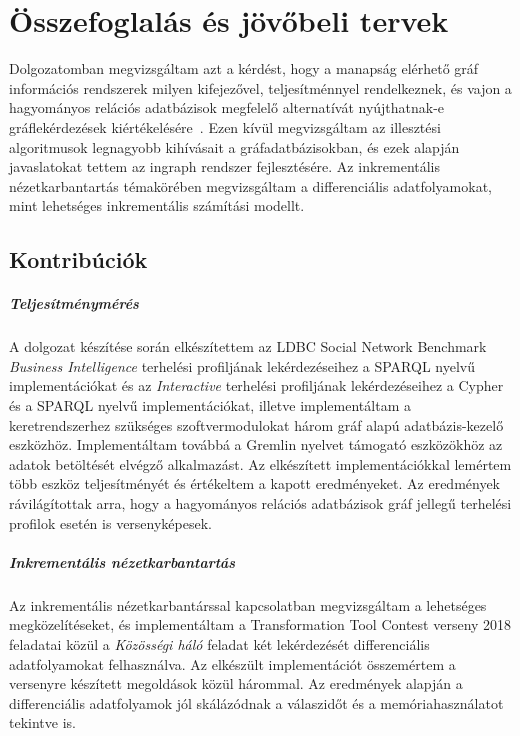 \chapter{Összefoglalás és jövőbeli tervek}\label{sec:osszefoglalo}

Dolgozatomban megvizsgáltam azt a kérdést, hogy a manapság elérhető gráf információs rendszerek milyen kifejezővel, teljesítménnyel rendelkeznek, és vajon a hagyományos relációs adatbázisok megfelelő alternatívát nyújthatnak-e gráflekérdezések kiértékelésére~\cite{DBLP:conf/grades/PacaciZLO17}. Ezen kívül megvizsgáltam az illesztési algoritmusok legnagyobb kihívásait a gráfadatbázisokban, és ezek alapján javaslatokat tettem az ingraph rendszer fejlesztésére. Az inkrementális nézetkarbantartás témakörében megvizsgáltam a differenciális adatfolyamokat, mint lehetséges inkrementális számítási modellt.

\section{Kontribúciók}

\paragraph{Teljesítménymérés}

A dolgozat készítése során elkészítettem az LDBC Social Network Benchmark \emph{Business Intelligence} terhelési profiljának lekérdezéseihez a SPARQL nyelvű implementációkat és az \emph{Interactive} terhelési profiljának lekérdezéseihez a Cypher és a SPARQL nyelvű implementációkat, illetve implementáltam a keretrendszerhez szükséges szoftvermodulokat három gráf alapú adatbázis-kezelő eszközhöz. Implementáltam továbbá a Gremlin nyelvet támogató eszközökhöz az adatok betöltését elvégző alkalmazást. Az elkészített implementációkkal lemértem több eszköz teljesítményét és értékeltem a kapott eredményeket. Az eredmények rávilágítottak arra, hogy a hagyományos relációs adatbázisok gráf jellegű terhelési profilok esetén is versenyképesek.

\paragraph{Inkrementális nézetkarbantartás}

Az inkrementális nézetkarbantárssal kapcsolatban megvizsgáltam a lehetséges megközelítéseket, és implementáltam a Transformation Tool Contest verseny 2018 feladatai közül a \emph{Közösségi háló} feladat két lekérdezését differenciális adatfolyamokat felhasználva. Az elkészült implementációt összemértem a versenyre készített megoldások közül hárommal. Az eredmények alapján a differenciális adatfolyamok jól skálázódnak a válaszidőt és a memóriahasználatot tekintve is.


